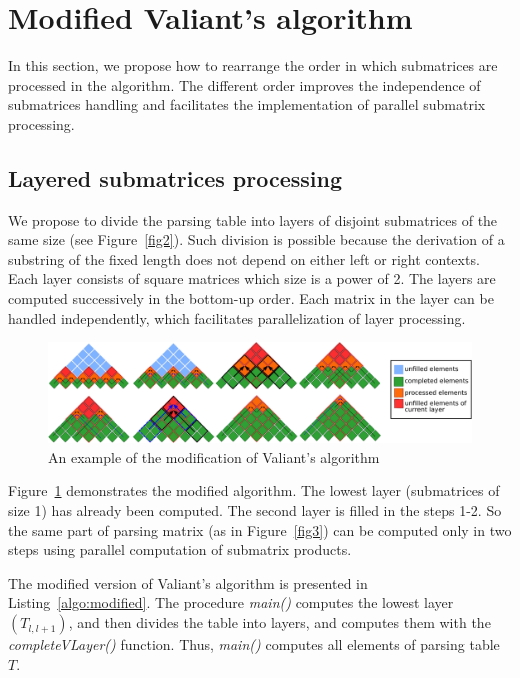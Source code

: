 \section{Modified Valiant's algorithm}

In this section, we propose how to rearrange the order in which submatrices are processed in the algorithm.
The different order improves the independence of submatrices handling and facilitates the implementation of parallel submatrix processing.

\subsection{Layered submatrices processing}

We propose to divide the parsing table into layers of disjoint submatrices of the same size (see Figure~\ref{fig2}).
Such division is possible because the derivation of a substring of the fixed length does not depend on either left or right contexts.
Each layer consists of square matrices which size is a power of 2.
The layers are computed successively in the bottom-up order.
Each matrix in the layer can be handled independently, which facilitates parallelization of layer processing.

\begin{figure}[h]
\vspace{3mm}
 \begin{center}
 \includegraphics[width=12cm]{pictures/modivis2.pdf}
    \caption{An example of the modification of Valiant's algorithm}
    \label{fig4}
 \end{center}
\vspace{-8mm}
\end{figure}

Figure~\ref{fig4} demonstrates the modified algorithm.
The lowest layer (submatrices of size 1) has already been computed.
The second layer is filled in the steps 1-2.
So the same part of parsing matrix (as in Figure~\ref{fig3}) can be computed only in two steps using parallel computation of submatrix products.

The modified version of Valiant's algorithm is presented in Listing~\ref{algo:modified}.
The procedure \textit{main()} computes the lowest layer $(T_{l, l+1})$, and then divides the table into layers, and computes them with the \textit{completeVLayer()} function.
Thus, \textit{main()} computes all elements of parsing table $T$.

